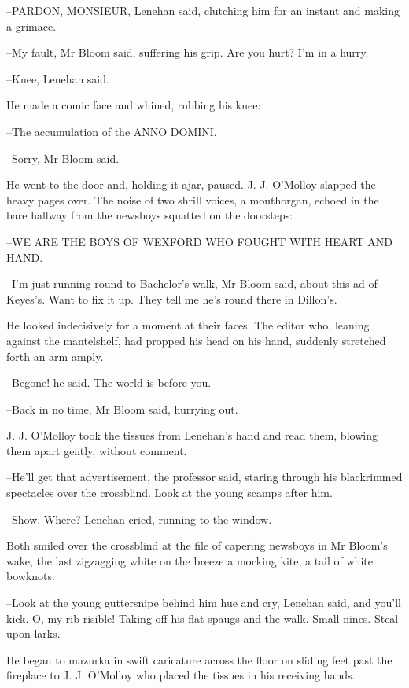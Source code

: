 --PARDON, MONSIEUR, Lenehan said, clutching him for an instant and making
a grimace.

--My fault, Mr Bloom said, suffering his grip. Are you hurt? I'm in a
hurry.

--Knee, Lenehan said.

He made a comic face and whined, rubbing his knee:

--The accumulation of the ANNO DOMINI.

--Sorry, Mr Bloom said.

He went to the door and, holding it ajar, paused. J. J. O'Molloy
slapped the heavy pages over. The noise of two shrill voices, a
mouthorgan, echoed in the bare hallway from the newsboys squatted on the
doorsteps:


  --WE ARE THE BOYS OF WEXFORD
    WHO FOUGHT WITH HEART AND HAND.



--I'm just running round to Bachelor's walk, Mr Bloom said, about this ad
of Keyes's. Want to fix it up. They tell me he's round there in Dillon's.

He looked indecisively for a moment at their faces. The editor who,
leaning against the mantelshelf, had propped his head on his hand,
suddenly stretched forth an arm amply.

--Begone! he said. The world is before you.

--Back in no time, Mr Bloom said, hurrying out.

J. J. O'Molloy took the tissues from Lenehan's hand and read them,
blowing them apart gently, without comment.

--He'll get that advertisement, the professor said, staring through his
blackrimmed spectacles over the crossblind. Look at the young scamps after
him.

--Show. Where? Lenehan cried, running to the window.



Both smiled over the crossblind at the file of capering newsboys in Mr
Bloom's wake, the last zigzagging white on the breeze a mocking kite, a
tail of white bowknots.

--Look at the young guttersnipe behind him hue and cry, Lenehan said, and
you'll kick. O, my rib risible! Taking off his flat spaugs and the walk.
Small nines. Steal upon larks.

He began to mazurka in swift caricature across the floor on sliding
feet past the fireplace to J. J. O'Molloy who placed the tissues in his
receiving hands.

